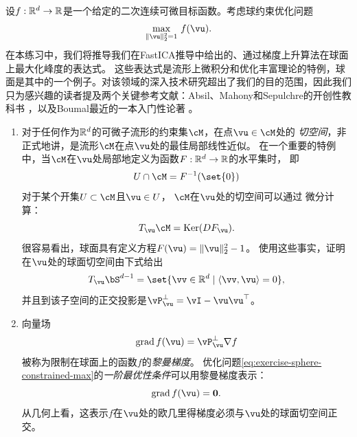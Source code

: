 \documentclass[../../book-main.tex]{subfiles}
\begin{document}
\begin{exercise}\label{exercise:sphere-calculus}
    设$f : \mathbb{R}^d \to \mathbb{R}$是一个给定的二次连续可微目标函数。考虑球约束优化问题
    \begin{equation}\label{eq:exercise-sphere-constrained-max}
        \max_{\norm{\vu}_2^2 = 1}\, f(\vu). 
    \end{equation}
    在本练习中，我们将推导我们在FastICA推导中给出的、通过梯度上升算法在球面上最大化峰度的表达式。
    这些表达式是流形上微积分和优化丰富理论的特例，球面是其中的一个例子。对该领域的深入技术研究超出了我们的目的范围，因此我们只为感兴趣的读者提及两个关键参考文献：Absil、Mahony和Sepulchre的开创性教科书
    \cite{Absil2009-nc}，以及Boumal最近的一本入门性论著 \cite{Boumal2023-rj}。
    \begin{enumerate}
        \item 对于任何作为$\mathbb{R}^d$的可微子流形的约束集$\cM$，在点$\vu \in \cM$处的
        \textit{切空间}，非正式地讲，是流形$\cM$在点$\vu$处的最佳局部线性近似。
        在一个重要的特例中，当$\cM$在$\vu$处局部地定义为函数$F : \mathbb{R}^d \to \mathbb{R}$的水平集时，
        即
        \begin{equation*}
            U \cap \cM = F^{-1}(\set{0})
        \end{equation*}
        对于某个开集$U \subset \cM$且$\vu \in U$，
        $\cM$在$\vu$处的切空间可以通过
        微分计算：
        \begin{equation*}
            T_{\vu} \cM = \Ker(DF_{\vu}).
        \end{equation*}
        很容易看出，球面具有定义方程$F(\vu) = \norm{\vu}_2^2 - 1$。
        使用这些事实，证明在$\vu$处的球面切空间由下式给出
        \begin{equation*}
            T_{\vu} \bS^{d-1} = \set{\vv \in \R^d \given \ip{\vv}{\vu} = 0},
        \end{equation*}
        并且到该子空间的正交投影是$\vP_{\vu}^\perp = \vI - \vu\vu^\top$。
        \item 向量场
        \begin{equation}\label{eq:exercise-riemann-grad-sphere}
        \mathrm{grad}\, f(\vu) = \vP_{\vu}^\perp \nabla f
        \end{equation}
        被称为限制在球面上的函数$f$的\textit{黎曼梯度}。
        优化问题\eqref{eq:exercise-sphere-constrained-max}的\textit{一阶最优性条件}可以用黎曼梯度表示：
        \begin{equation*}
            \mathrm{grad}\, f(\vu) = \mathbf{0}.
        \end{equation*}
        从几何上看，这表示$f$在$\vu$处的欧几里得梯度必须与$\vu$处的球面切空间正交。

\end{enumerate}
\end{exercise}
\end{document}
